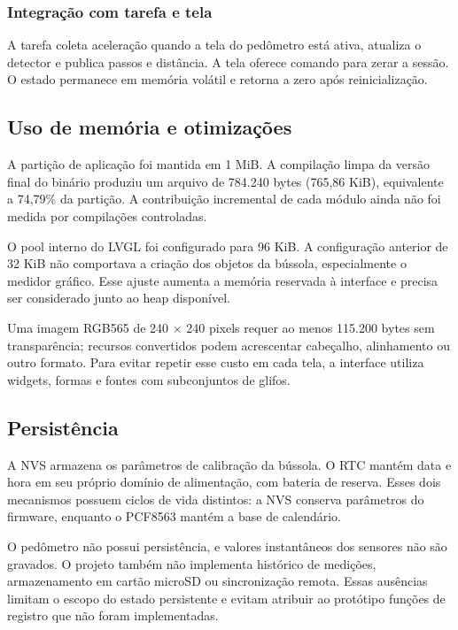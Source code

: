 \documentclass[a4paper,12pt]{article}
\begin{document}
\subsubsection{Integra\c{c}\~ao com tarefa e tela}


A tarefa coleta acelera\c{c}\~ao quando a tela do ped\^ometro est\'a ativa, atualiza o detector e publica passos e dist\^ancia. A tela oferece comando para zerar a sess\~ao. O estado permanece em mem\'oria vol\'atil e retorna a zero ap\'os reinicializa\c{c}\~ao.


\subsection{Uso de mem\'oria e otimiza\c{c}\~oes}


A parti\c{c}\~ao de aplica\c{c}\~ao foi mantida em 1 MiB. A compila\c{c}\~ao limpa da vers\~ao final do bin\'ario produziu um arquivo de 784.240 bytes (765,86 KiB), equivalente a 74,79\% da parti\c{c}\~ao. A contribui\c{c}\~ao incremental de cada m\'odulo ainda n\~ao foi medida por compila\c{c}\~oes controladas.


O pool interno do LVGL foi configurado para 96 KiB. A configura\c{c}\~ao anterior de 32 KiB n\~ao comportava a cria\c{c}\~ao dos objetos da b\'ussola, especialmente o medidor gr\'afico. Esse ajuste aumenta a mem\'oria reservada \`a interface e precisa ser considerado junto ao heap dispon\'ivel.


Uma imagem RGB565 de 240 $\times$ 240 pixels requer ao menos 115.200 bytes sem transpar\^encia; recursos convertidos podem acrescentar cabe\c{c}alho, alinhamento ou outro formato. Para evitar repetir esse custo em cada tela, a interface utiliza widgets, formas e fontes com subconjuntos de glifos.


\subsection{Persist\^encia}


A NVS armazena os par\^ametros de calibra\c{c}\~ao da b\'ussola. O RTC mant\'em data e hora em seu pr\'oprio dom\'inio de alimenta\c{c}\~ao, com bateria de reserva. Esses dois mecanismos possuem ciclos de vida distintos: a NVS conserva par\^ametros do firmware, enquanto o PCF8563 mant\'em a base de calend\'ario.


O ped\^ometro n\~ao possui persist\^encia, e valores instant\^aneos dos sensores n\~ao s\~ao gravados. O projeto tamb\'em n\~ao implementa hist\'orico de medi\c{c}\~oes, armazenamento em cart\~ao microSD ou sincroniza\c{c}\~ao remota. Essas aus\^encias limitam o escopo do estado persistente e evitam atribuir ao prot\'otipo fun\c{c}\~oes de registro que n\~ao foram implementadas.
\end{document}
